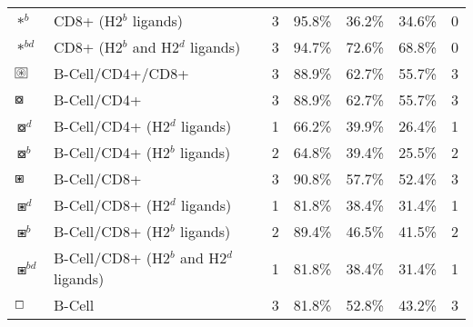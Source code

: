 \begin{tabular}{llccccc}
                                          $ \ast^b $ &                    CD8+ (H2$^b$ ligands) &            3 &         95.8\% &          36.2\% &         34.6\% &                          0 \\
                                       $ \ast^{bd} $ &         CD8+ (H2$^b$ and H2$^d$ ligands) &            3 &         94.7\% &          72.6\% &         68.8\% &                          0 \\
 $ \setlength{\fboxsep}{0.5pt} \boxed{\circledast} $ &                         B-Cell/CD4+/CD8+ &            3 &         88.9\% &          62.7\% &         55.7\% &                          3 \\
                                      $ \boxcircle $ &                              B-Cell/CD4+ &            3 &         88.9\% &          62.7\% &         55.7\% &                          3 \\
                                    $ \boxcircle^d $ &             B-Cell/CD4+ (H2$^d$ ligands) &            1 &         66.2\% &          39.9\% &         26.4\% &                          1 \\
                                    $ \boxcircle^b $ &             B-Cell/CD4+ (H2$^b$ ligands) &            2 &         64.8\% &          39.4\% &         25.5\% &                          2 \\
                                         $ \boxast $ &                              B-Cell/CD8+ &            3 &         90.8\% &          57.7\% &         52.4\% &                          3 \\
                                       $ \boxast^d $ &             B-Cell/CD8+ (H2$^d$ ligands) &            1 &         81.8\% &          38.4\% &         31.4\% &                          1 \\
                                       $ \boxast^b $ &             B-Cell/CD8+ (H2$^b$ ligands) &            2 &         89.4\% &          46.5\% &         41.5\% &                          2 \\
                                    $ \boxast^{bd} $ &  B-Cell/CD8+ (H2$^b$ and H2$^d$ ligands) &            1 &         81.8\% &          38.4\% &         31.4\% &                          1 \\
                                       $ \boxempty $ &                                   B-Cell &            3 &         81.8\% &          52.8\% &         43.2\% &                          3 \\
\bottomrule
\end{tabular}
